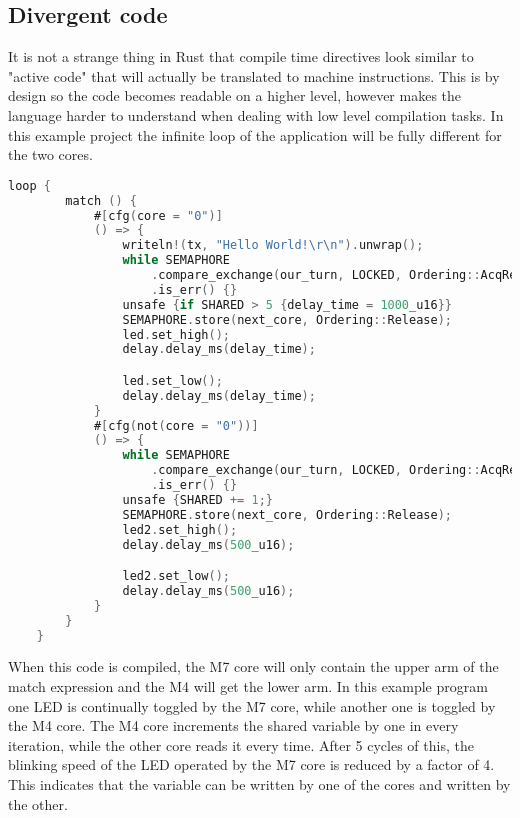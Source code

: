 \subsection{Divergent code}

It is not a strange thing in Rust that compile time directives look similar to "active code" that will actually be translated to machine instructions. This is by design so the code becomes readable on a higher level, however makes the language harder to understand when dealing with low level compilation tasks. In this example project the infinite loop of the application will be fully different for the two cores.

\begin{lstlisting}[language=C,frame=single,float=!ht,label={lst:divergent-code},caption={Example of Diverging Code}]
    loop {
        match () {
            #[cfg(core = "0")]
            () => {
                writeln!(tx, "Hello World!\r\n").unwrap();
                while SEMAPHORE
                    .compare_exchange(our_turn, LOCKED, Ordering::AcqRel, Ordering::Relaxed)
                    .is_err() {}
                unsafe {if SHARED > 5 {delay_time = 1000_u16}}
                SEMAPHORE.store(next_core, Ordering::Release);
                led.set_high();
                delay.delay_ms(delay_time);

                led.set_low();
                delay.delay_ms(delay_time);
            }
            #[cfg(not(core = "0"))]
            () => {
                while SEMAPHORE
                    .compare_exchange(our_turn, LOCKED, Ordering::AcqRel, Ordering::Relaxed)
                    .is_err() {}
                unsafe {SHARED += 1;}
                SEMAPHORE.store(next_core, Ordering::Release);
                led2.set_high();
                delay.delay_ms(500_u16);

                led2.set_low();
                delay.delay_ms(500_u16);
            }
        }
    }
\end{lstlisting}

When this code is compiled, the M7 core will only contain the upper arm of the match expression and the M4 will get the lower arm. In this example program one LED is continually toggled by the M7 core, while another one is toggled by the M4 core. The M4 core increments the shared variable by one in every iteration, while the other core reads it every time. After 5 cycles of this, the blinking speed of the LED operated by the M7 core is reduced by a factor of 4. This indicates that the variable can be written by one of the cores and written by the other.

